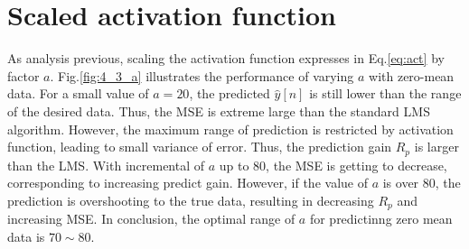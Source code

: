\section{Scaled activation function}
As analysis previous, scaling the activation function expresses in Eq.\ref{eq:act} by factor $a$. Fig.\ref{fig:4_3_a} illustrates the performance of varying $a$ with zero-mean data. For a small value of $a=20$, the predicted $\hat y[n]$ is still lower than the range of the desired data. Thus, the MSE is extreme large than the standard LMS algorithm. However, the maximum range of prediction is restricted by activation function, leading to small variance of error. Thus, the prediction gain $R_p$ is larger than the LMS. With incremental of $a$ up to 80, the MSE is getting to decrease, corresponding to increasing predict gain. However, if the value of $a$ is over 80, the prediction is overshooting to the true data, resulting in decreasing $R_p$ and increasing MSE. In conclusion, the optimal range of $a$ for predictinng zero mean data is $70\sim80$.
